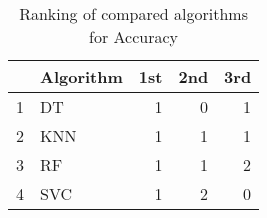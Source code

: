 \begin{table}
\footnotesize
\caption{Ranking of compared algorithms for Accuracy}
\label{tab:places Accuracy}
\begin{tabular}{llrrr}
\hline
 & Algorithm & 1st & 2nd & 3rd \\
\hline
1 & DT & 1 & 0 & 1 \\
2 & KNN & 1 & 1 & 1 \\
3 & RF & 1 & 1 & 2 \\
4 & SVC & 1 & 2 & 0 \\
\hline
\end{tabular}
\end{table}
